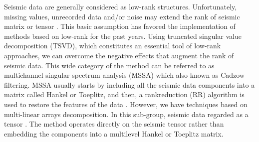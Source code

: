 Seismic data are generally considered as low-rank structures. Unfortunately, missing values, unrecorded data and/or noise may extend the rank of seismic matrix or tensor \citep{chen2016simultaneous}. This basic assumption has favored the implementation of methods based on low-rank  for the past years. Using truncated singular value decomposition (TSVD), which constitutes an essential tool of low-rank approaches, we can overcome the negative effects that augment the rank of seismic data. This wide category of the method can be referred to as multichannel singular spectrum analysis (MSSA)\wen{,} which  also known as Cadzow filtering. MSSA usually starts by including all the seismic data components into a matrix called Hankel or Toeplitz, and then, a rank\wen{-}reduction (RR) algorithm is used to restore the  features of the data \citep{chen2016open,chen2016simultaneous,huang2016damped,huang2017double,zhang2017hybrid}. However, we have techniques based on multi-linear arrays decomposition. In this sub-group, seismic data  regarded as a tensor \citep{kreimer2012tensor,gao2015parallel}. The method operates directly on the seismic tensor rather than embedding the components into a multilevel Hankel or Toeplitz matrix.

